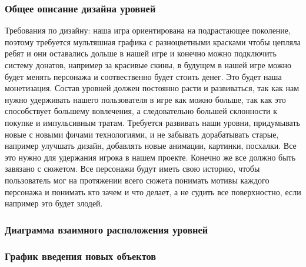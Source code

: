\documentclass[a4paper,12pt]{article}
\begin{document}
\subsubsection{Общее описание дизайна уровней}
Требования по дизайну: наша игра ориентирована на подрастающее поколение, поэтому требуется мультяшная графика с разноцветными красками чтобы цепляла ребят и они оставались дольше в нашей игре и конечно можно подключить систему донатов, например за красивые скины, в будущем в нашей игре можно будет менять персонажа и соотвественно будет стоить денег. Это будет наша монетизация. Состав уровней должен постоянно расти и развиваться, так как нам нужно удерживать нашего пользователя в игре как можно больше, так как это способствует большему вовлечения, а следовательно большей склонности к покупке и импульсивным тратам. Требуется развивать наши уровни, придумывать новые с новыми фичами технологиями, и не забывать дорабатывать старые, например улучшать дизайн, добавлять новые анимации, картинки, посхалки. Все это нужно для удержания игрока в нашем проекте. Конечно же все должно быть завязано с сюжетом. Все персонажи будут иметь свою историю, чтобы пользователь мог на протяжении всего сюжета понимать мотивы каждого персонажа и понимать кто зачем и что делает, а не судить все поверхностно, если например это будет злодей.
\subsubsection{Диаграмма взаимного расположения уровней}
\subsubsection{График введения новых объектов}
\end{document}
